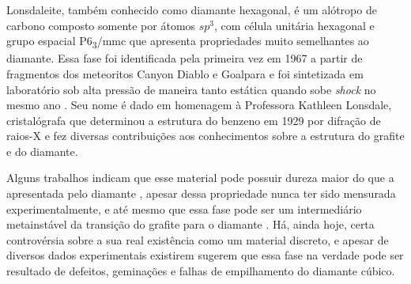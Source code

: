  		Lonsdaleite, também conhecido como diamante hexagonal, é um alótropo de carbono composto somente por átomos $sp^3$, com célula unitária hexagonal e grupo espacial P6\textsubscript{3}/mmc que apresenta propriedades muito semelhantes ao diamante. Essa fase foi identificada pela primeira vez em 1967 a partir de fragmentos dos meteoritos Canyon Diablo e Goalpara\cite{hanneman1967hexagonal} e foi sintetizada em laboratório sob alta pressão de maneira tanto estática quando sobe \textit{shock} no mesmo ano \cite{frondel1967lonsdaleite}. Seu nome é dado em homenagem à Professora Kathleen Lonsdale, cristalógrafa que determinou a estrutura do benzeno em 1929 por difração de raios-X \cite{lonsdale1929structure} e fez diversas contribuições aos conhecimentos sobre a estrutura do grafite e do diamante. 
 		
 		Alguns trabalhos indicam que esse material pode possuir dureza maior do que a apresentada pelo diamante \cite{pan2009harder}, apesar dessa propriedade nunca ter sido mensurada experimentalmente, e até mesmo que essa fase pode ser um intermediário metainstável da transição do grafite para o diamante \cite{fayos1999possible, kraus2016nanosecond}. Há, ainda hoje, certa controvérsia sobre a sua real existência como um material discreto, e apesar de diversos dados experimentais existirem \citeauthor{nemeth2014lonsdaleite} sugerem que essa fase na verdade pode ser resultado de defeitos, geminações e falhas de empilhamento do diamante cúbico. 
 		
